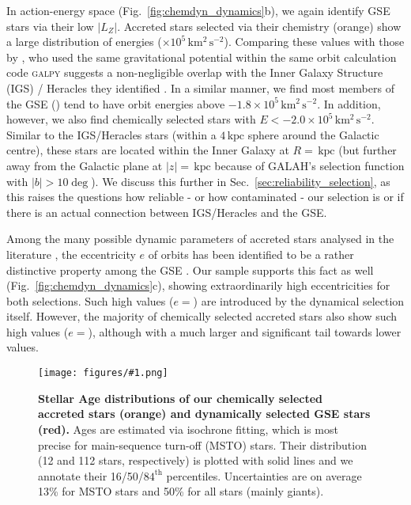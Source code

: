 \documentclass[fleqn,usenatbib]{mnras}
\newcommand{\kpc}{\,\mathrm{kpc}}	%
\newcommand{\kmkmss}{\,\mathrm{km^2\,s^{-2}}}	%
\newcommand{\codeicon}{{\faCloudDownload}}
\newcommand{\codelink}[1]{\href{https://github.com/svenbuder/Accreted-stars-in-GALAH-DR3/tree/main/figures/#1.ipynb}{\codeicon}\,\,}
\newcommand{\oscaption}[2]{\caption{#2 \codelink{#1}}}
\newcommand{\figurecolumnwidth}[3]{\begin{figure} \centering \texttt{[image: figures/\#1.png]}\oscaption{#2}{#3}\label{fig:#1} \end{figure}}
\begin{document}
In action-energy space (Fig.~\ref{fig:chemdyn_dynamics}b), we again identify GSE stars via their low $\vert L_Z \vert$. Accreted stars selected via their chemistry (orange) show a large distribution of energies ($ \times 10^5 \kmkmss$). Comparing these values with those by \citet{Horta2021}, who used the same gravitational potential \citep{McMillan2017} within the same orbit calculation code \textsc{galpy} \citep{Bovy2015, Mackereth2018} suggests a non-negligible overlap with the Inner Galaxy Structure (IGS) / Heracles they identified \citep{Horta2021}. In a similar manner, we find most members of the GSE () tend to have orbit energies above $-1.8 \times 10^5 \kmkmss$. In addition, however, we also find  chemically selected stars with $E < -2.0 \times 10^5 \kmkmss$. Similar to the IGS/Heracles stars (within a $4\kpc$ sphere around the Galactic centre), these stars are located within the Inner Galaxy at $R = $$ \kpc$ (but further away from the Galactic plane at $\vert z \vert =$$\kpc$ because of GALAH's selection function with $\vert b \vert > 10\deg$). We discuss this further in Sec.~\ref{sec:reliability_selection}, as this raises the questions how reliable - or how contaminated - our selection is or if there is an actual connection between IGS/Heracles and the GSE.

Among the many possible dynamic parameters of accreted stars analysed in the literature \citep[e.g.][]{Schuster2012}, the eccentricity $e$ of orbits has been identified to be a rather distinctive property among the GSE \citep{Mackereth2019, Naidu2020}. Our sample supports this fact as well (Fig.~\ref{fig:chemdyn_dynamics}c), showing extraordinarily high eccentricities for both selections. Such high values ($e=$) are introduced by the dynamical selection itself. However, the majority of chemically selected accreted stars also show such high values ($e=$), although with a much larger and significant tail towards lower values.

\figurecolumnwidth{age_histogram}{stellar_ages}{
\textbf{Stellar Age distributions of our chemically selected accreted stars (orange) and dynamically selected GSE stars (red).} Ages are estimated via isochrone fitting, which is most precise for main-sequence turn-off (MSTO) stars. Their distribution (12 and 112 stars, respectively) is plotted with solid lines and we annotate their 16/50/$84^\text{th}$ percentiles. Uncertainties are on average 13\% for MSTO stars and 50\% for all stars (mainly giants).
}
\end{document}
